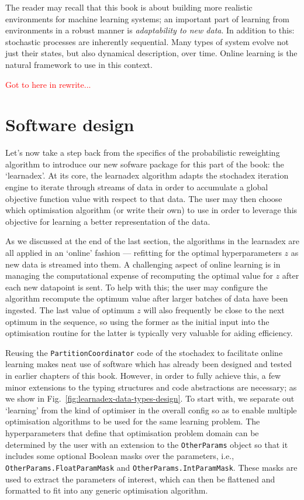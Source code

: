 The reader may recall that this book is about building more realistic environments for machine learning systems; an important part of learning from environments in a robust manner is \emph{adaptability to new data}. In addition to this: stochastic processes are inherently sequential. Many types of system evolve not just their states, but also dynamical description, over time. Online learning is the natural framework to use in this context.

\textcolor{red}{Got to here in rewrite...}

\section{\sffamily Software design}

Let's now take a step back from the specifics of the probabilistic reweighting algorithm to introduce our new sofware package for this part of the book: the `learnadex'. At its core, the learnadex algorithm adapts the stochadex iteration engine to iterate through streams of data in order to accumulate a global objective function value with respect to that data. The user may then choose which optimisation algorithm (or write their own) to use in order to leverage this objective for learning a better representation of the data. 

As we discussed at the end of the last section, the algorithms in the learnadex are all applied in an `online' fashion --- refitting for the optimal hyperparameters $z$ as new data is streamed into them. A challenging aspect of online learning is in managing the computational expense of recomputing the optimal value for $z$ after each new datapoint is sent. To help with this; the user may configure the algorithm recompute the optimum value after larger batches of data have been ingested. The last value of optimum $z$ will also frequently be close to the next optimum in the sequence, so using the former as the initial input into the optimisation routine for the latter is typically very valuable for aiding efficiency.

Reusing the \texttt{PartitionCoordinator} code of the stochadex to facilitate online learning makes neat use of software which has already been designed and tested in earlier chapters of this book. However, in order to fully achieve this, a few minor extensions to the typing structures and code abstractions are necessary; as we show in Fig.~\ref{fig:learnadex-data-types-design}. To start with, we separate out `learning' from the kind of optimiser in the overall config so as to enable multiple optimisation algorithms to be used for the same learning problem. The hyperparameters that define that optimisation problem domain can be determined by the user with an extension to the \texttt{OtherParams} object so that it includes some optional Boolean masks over the parameters, i.e., \texttt{OtherParams.FloatParamMask} and \texttt{OtherParams.IntParamMask}. These masks are used to extract the parameters of interest, which can then be flattened and formatted to fit into any generic optimisation algorithm.

